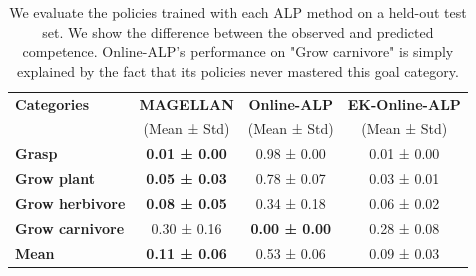 \documentclass{article}
\begin{document}

\begin{table}[ht]
\centering
\fontsize{7.6pt}{10pt}\selectfont
\caption{We evaluate the policies trained with each ALP method on a held-out test set. We show the difference between the observed and predicted competence. Online-ALP's performance on "Grow carnivore" is simply explained by the fact that its policies never mastered this goal category.}
\begin{tabular}{lcc||c}
\toprule
\textbf{Categories}          & \textbf{MAGELLAN} & \textbf{Online-ALP} & \textbf{EK-Online-ALP} \\ 
                       & (Mean ± Std)      & (Mean ± Std)       & (Mean ± Std)         \\ 
\midrule
\textbf{Grasp}         & \textbf{0.01 ± 0.00}       & 0.98 ± 0.00        & 0.01 ± 0.00          \\ 
\textbf{Grow plant}     & \textbf{0.05 ± 0.03}       & 0.78 ± 0.07        & 0.03 ± 0.01          \\ 
\textbf{Grow herbivore} & \textbf{0.08 ± 0.05}       & 0.34 ± 0.18        & 0.06 ± 0.02          \\ 
\textbf{Grow carnivore} & 0.30 ± 0.16       & \textbf{0.00 ± 0.00}        & 0.28 ± 0.08          \\ 
\midrule
\textbf{Mean}           & \textbf{0.11 ± 0.06}       & 0.53 ± 0.06        & 0.09 ± 0.03          \\ 
\bottomrule
\end{tabular}
\label{tab:table_sp_test}
\end{table}
\end{document}
